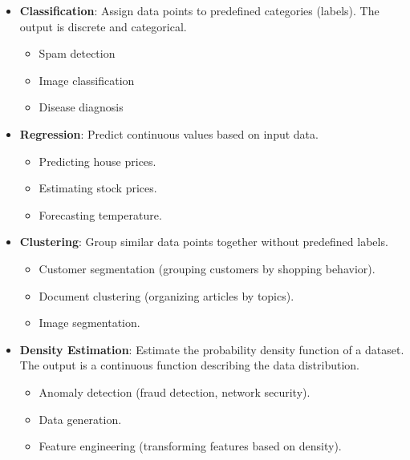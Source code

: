 \begin{itemize}
    \item {
        \textbf{Classification}: Assign data points to predefined categories (labels). The output is discrete and categorical.
        \begin{itemize}
            \item { Spam detection }
            \item { Image classification }
            \item { Disease diagnosis }
        \end{itemize}
    }
    \item {
        \textbf{Regression}: Predict continuous values based on input data.
        \begin{itemize}
            \item { Predicting house prices. }
            \item { Estimating stock prices. }
            \item { Forecasting temperature. }
        \end{itemize}
    }
    \item {
        \textbf{Clustering}: Group similar data points together without predefined labels.
        \begin{itemize}
            \item { Customer segmentation (grouping customers by shopping behavior). }
            \item { Document clustering (organizing articles by topics). }
            \item { Image segmentation. }
        \end{itemize}
    }
    \item {
        \textbf{Density Estimation}: Estimate the probability density function of a dataset. The output is a continuous function describing the data distribution.
        \begin{itemize}
            \item { Anomaly detection (fraud detection, network security). }
            \item { Data generation. }
            \item { Feature engineering (transforming features based on density). }
        \end{itemize}
    }
\end{itemize}
